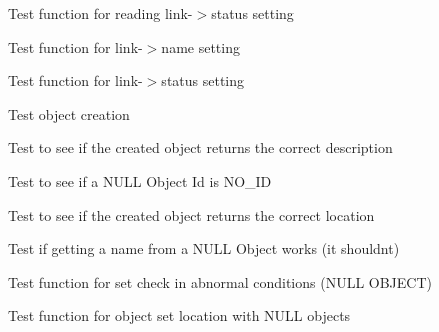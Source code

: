 \begin{DoxyRefList}
\item[\label{test__test000140}%
\hypertarget{test__test000140}{}%
Member \hyperlink{link__test_8h_a7d1062febd832b21e69df5f071425b4c}{test2\+\_\+link\+\_\+get\+\_\+status} ()]Test function for reading link-\/$>$status setting  
\item[\label{test__test000128}%
\hypertarget{test__test000128}{}%
Member \hyperlink{link__test_8h_aa66c1e991620a5a758ba6e4d6b4a8b73}{test2\+\_\+link\+\_\+set\+\_\+name} ()]Test function for link-\/$>$name setting  
\item[\label{test__test000134}%
\hypertarget{test__test000134}{}%
Member \hyperlink{link__test_8h_a315ea19cd24434d2153b5df9f372a561}{test2\+\_\+link\+\_\+set\+\_\+status} ()]Test function for link-\/$>$status setting  
\item[\label{test__test000147}%
\hypertarget{test__test000147}{}%
Member \hyperlink{object__test_8h_add54ab5e33a1b0a93e9ddcf73591bd9f}{test2\+\_\+object\+\_\+create} ()]Test object creation  
\item[\label{test__test000163}%
\hypertarget{test__test000163}{}%
Member \hyperlink{object__test_8h_a0a46a923bd913c88dc697341d19cfb2b}{test2\+\_\+object\+\_\+get\+\_\+check} ()]Test to see if the created object returns the correct description  
\item[\label{test__test000159}%
\hypertarget{test__test000159}{}%
Member \hyperlink{object__test_8h_a1ff250f0f43297f57fcce1f3a6ae490b}{test2\+\_\+object\+\_\+get\+\_\+id} ()]Test to see if a N\+U\+LL Object Id is N\+O\+\_\+\+ID  
\item[\label{test__test000161}%
\hypertarget{test__test000161}{}%
Member \hyperlink{object__test_8h_aa8e3d1f2c80097572d9a453737d8cd44}{test2\+\_\+object\+\_\+get\+\_\+location} ()]Test to see if the created object returns the correct location  
\item[\label{test__test000157}%
\hypertarget{test__test000157}{}%
Member \hyperlink{object__test_8h_abdfafbc7b8588d3dcdb05fd2beb2397e}{test2\+\_\+object\+\_\+get\+\_\+name} ()]Test if getting a name from a N\+U\+LL Object works (it shouldn\textquotesingle{}t)  
\item[\label{test__test000155}%
\hypertarget{test__test000155}{}%
Member \hyperlink{object__test_8h_a16f5685f75ace0aaaeef2b296d64221d}{test2\+\_\+object\+\_\+set\+\_\+check} ()]Test function for set check in abnormal conditions (N\+U\+LL O\+B\+J\+E\+CT)  
\item[\label{test__test000152}%
\hypertarget{test__test000152}{}%
Member \hyperlink{object__test_8h_a552de466dc09eaef60eff5835455fbb6}{test2\+\_\+object\+\_\+set\+\_\+location} ()]Test function for object set location with N\+U\+LL objects  

\end{DoxyRefList}
